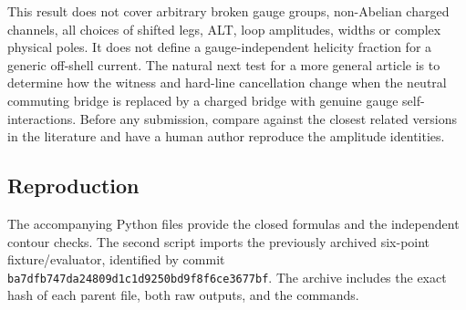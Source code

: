\documentclass[
  11pt,
]{article}
\begin{document}
This result does not cover arbitrary broken gauge groups, non-Abelian
charged channels, all choices of shifted legs, ALT, loop amplitudes,
widths or complex physical poles. It does not define a gauge-independent
helicity fraction for a generic off-shell current. The natural next test
for a more general article is to determine how the witness and hard-line
cancellation change when the neutral commuting bridge is replaced by a
charged bridge with genuine gauge self-interactions. Before any
submission, compare against the closest related versions in the
literature and have a human author reproduce the amplitude identities.

\subsection{Reproduction}\label{reproduction}

The accompanying Python files provide the closed formulas and the
independent contour checks. The second script imports the previously
archived six-point fixture/evaluator, identified by commit
\texttt{ba7dfb747da24809d1c1d9250bd9f8f6ce3677bf}. The archive includes
the exact hash of each parent file, both raw outputs, and the commands.
\end{document}
